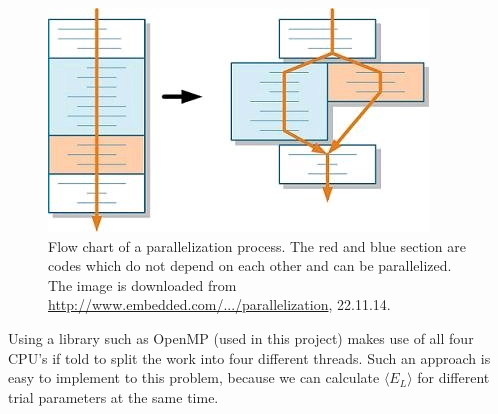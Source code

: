 \begin{figure}[h!]
	\centering 
	\includegraphics[scale=3]{theory/parallelization.jpg}
	\caption{Flow chart of a parallelization process. The red and blue section are codes which do not depend on each other and can be parallelized. The image is downloaded from \href{http://www.embedded.com/design/mcus-processors-and-socs/4204441/How-to-analyze-C-code-for-parallelization}{http://www.embedded.com/.../parallelization}, 22.11.14.}
	\label{fig:parallelization}
\end{figure}

Using a library such as OpenMP (used in this project) makes use of all four CPU's if told to split the work into four different threads. 
Such an approach is easy to implement to this problem, because we can calculate $\langle E_L \rangle$ for different trial parameters at the same time. 

